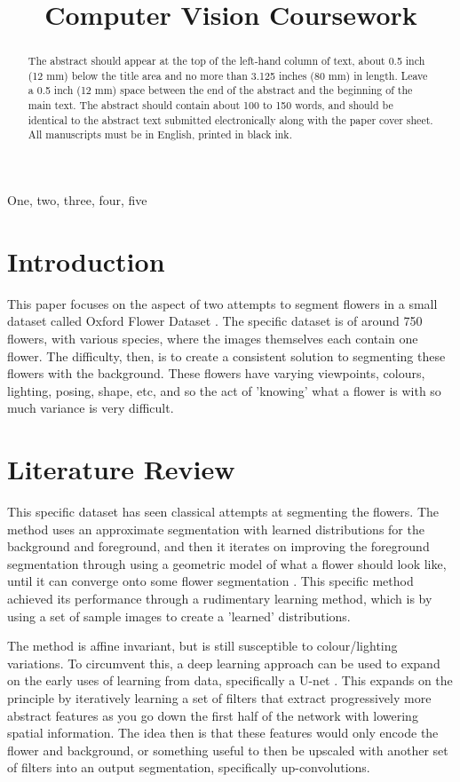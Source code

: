 \documentclass{article}
\title{Computer Vision Coursework}
\begin{document}
%
\maketitle
%
\begin{abstract}
The abstract should appear at the top of the left-hand column of text, about
0.5 inch (12 mm) below the title area and no more than 3.125 inches (80 mm) in
length.  Leave a 0.5 inch (12 mm) space between the end of the abstract and the
beginning of the main text.  The abstract should contain about 100 to 150
words, and should be identical to the abstract text submitted electronically
along with the paper cover sheet.  All manuscripts must be in English, printed
in black ink.
\end{abstract}
%
\begin{keywords}
One, two, three, four, five
\end{keywords}
%
\section{Introduction}
\label{sec:intro}

This paper focuses on the aspect of two attempts to segment flowers in a small dataset called Oxford Flower Dataset \autocite{nilsbackVisualVocabularyFlower2006}. The specific dataset is of around 750 flowers, with various species, where the images themselves each contain one flower. The difficulty, then, is to create a consistent solution to segmenting these flowers with the background. These flowers have varying viewpoints, colours, lighting, posing, shape, etc, and so the act of 'knowing' what a flower is with so much variance is very difficult.
\section{Literature Review}
\label{sec:format}

This specific dataset has seen classical attempts at segmenting the flowers. The method uses an approximate segmentation with learned distributions for the background and foreground, and then it iterates on improving the foreground segmentation through using a geometric model of what a flower should look like, until it can converge onto some flower segmentation \autocite{nilsbackDelvingDeeperWhorl2010}. This specific method achieved its performance through a rudimentary learning method, which is by using a set of sample images to create a 'learned' distributions. 

The method is affine invariant, but is still susceptible to colour/lighting variations. To circumvent this, a deep learning approach can be used to expand on the early uses of learning from data, specifically a U-net \autocite{ronnebergerUNetConvolutionalNetworks2015}. This expands on the principle by iteratively learning a set of filters that extract progressively more abstract features as you go down the first half of the network with lowering spatial information. The idea then is that these features would only encode the flower and background, or something useful to then be upscaled with another set of filters into an output segmentation, specifically up-convolutions.
\end{document}
